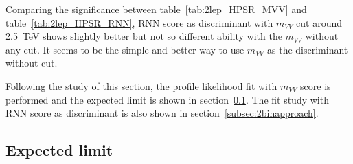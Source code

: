 \begin{table}[ht!]
\small
\begin{center}
\caption{Best cut point table for binned significance for RNN score distribution in \tlep channel LPSR}
\label{tab:2lep_LPSR_RNN}
\end{center}
\end{table}

Comparing the significance between table~\ref{tab:2lep_HPSR_MVV} and table~\ref{tab:2lep_HPSR_RNN}, 
RNN score as discriminant with $m_{VV}$ cut around 2.5~TeV shows slightly better but not so different ability with the $m_{VV}$ without any cut.
It seems to be the simple and better way to use $m_{VV}$ as the discriminant without cut. 

Following the study of this section, the profile likelihood fit with $m_{VV}$ score is performed and the expected limit is shown in section~\ref{subsec:aqgc_limit}. The fit study with RNN score as discriminant is also shown in section~\ref{subsec:2binapproach}.

\subsection{Expected limit}
\label{subsec:aqgc_limit}

